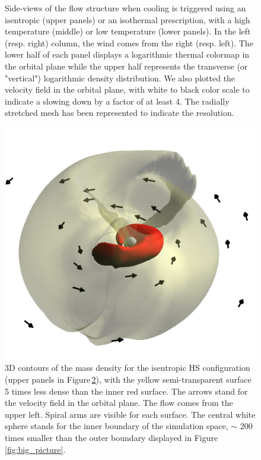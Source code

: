 \documentclass{aa}
\begin{document}
\begin{figure}
\begin{subfigure}{0.5\textwidth}
\begin{center}
\label{fig:subim2}
\end{center}
\end{subfigure}
\caption{Side-views of the flow structure when cooling is triggered using an isentropic (upper panels) or an isothermal prescription, with a high temperature (middle) or low temperature (lower panels). In the left (resp. right) column, the wind comes from the right (resp. left). The lower half of each panel displays a logarithmic thermal colormap in the orbital plane while the upper half represents the transverse (or "vertical") logarithmic density distribution. We also plotted the velocity field in the orbital plane, with white to black color scale to indicate a slowing down by a factor of at least 4. The radially stretched mesh has been represented to indicate the resolution.}
\label{fig:cooled_ones}
\end{figure}

\begin{figure}
\centering
\includegraphics[width=0.95\columnwidth]{Pictures/disc.png}
\caption{3D contours of the mass density for the isentropic HS configuration (upper panels in Figure\,\ref{fig:cooled_ones}), with the yellow semi-transparent surface 5 times less dense than the inner red surface. The arrows stand for the velocity field in the orbital plane. The flow comes from the upper left. Spiral arms are visible for each surface. The central white sphere stands for the inner boundary of the simulation space, $\sim$ 200 times smaller than the outer boundary displayed in Figure\,\ref{fig:big_picture}.}
\label{fig:disc}
\end{figure} 
\end{document}
